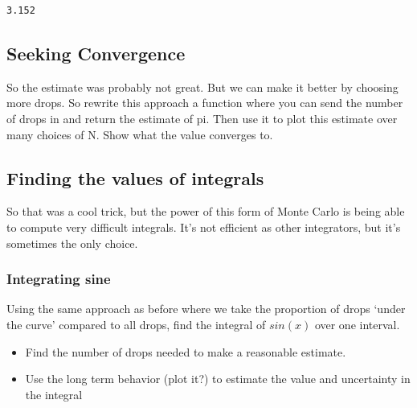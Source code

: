 \begin{verbatim}
3.152
\end{verbatim}

\subsection{Seeking Convergence}\label{seeking-convergence}

So the estimate was probably not great. But we can make it better by
choosing more drops. So rewrite this approach a function where you can
send the number of drops in and return the estimate of pi. Then use it
to plot this estimate over many choices of N. Show what the value
converges to.

\begin{Shaded}
\begin{Highlighting}[]
\end{Highlighting}
\end{Shaded}

\subsection{Finding the values of
integrals}\label{finding-the-values-of-integrals}

So that was a cool trick, but the power of this form of Monte Carlo is
being able to compute very difficult integrals. It's not efficient as
other integrators, but it's sometimes the only choice.

\subsubsection{Integrating sine}\label{integrating-sine}

Using the same approach as before where we take the proportion of drops
`under the curve' compared to all drops, find the integral of \(sin(x)\)
over one interval.

\begin{itemize}
\tightlist
\item
  Find the number of drops needed to make a reasonable estimate.
\item
  Use the long term behavior (plot it?) to estimate the value and
  uncertainty in the integral
\end{itemize}

\begin{Shaded}
\begin{Highlighting}[]
\end{Highlighting}
\end{Shaded}

